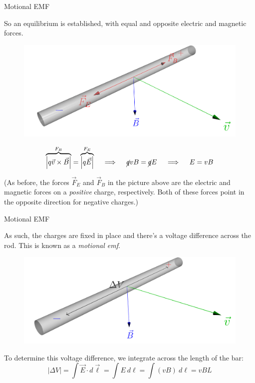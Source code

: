 \documentclass{beamer}
\begin{document}
\begin{frame}{Motional EMF}

So an equilibrium is established, with equal and opposite electric and magnetic forces.

\begin{figure}[H]
\centering
\includegraphics[scale=0.12]{figures/equilibrium.png}
\end{figure}

\vspace{-2.2em}

\begin{gather*}
    \overbrace{\left| q\vec{v} \times \vec{B} \right|}^{F_B} = \overbrace{\left| q\vec{E} \right|}^{F_E} \quad \implies \quad \cancel{q} vB = \cancel{q} E \quad \implies \quad E = vB
\end{gather*}

(As before, the forces $\vec{F}_E$ and $\vec{F}_B$ in the picture above are the electric and magnetic forces on a \emph{positive} charge, respectively. Both of these forces point in the opposite direction for negative charges.)

\end{frame}

\begin{frame}{Motional EMF}

As such, the charges are fixed in place and there's a voltage difference across the rod. This is known as a \emph{motional emf}.

\begin{figure}[H]
\centering
\includegraphics[scale=0.16]{figures/motionalvoltage.png}
\end{figure}

To determine this voltage difference, we integrate across the length of the bar:
\begin{equation*}
    \left| \Delta V \right| = \int \vec{E} \cdot d\vec{\ell} = \int E\ d\ell = \int (vB)\ d\ell = vBL
\end{equation*}

\end{frame}
\end{document}
